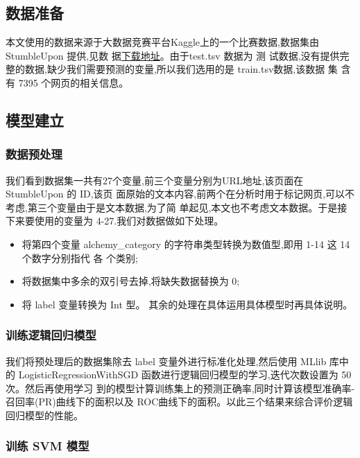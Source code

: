 \subsection{数据准备}\label{ux6570ux636eux51c6ux5907}

本文使用的数据来源于大数据竞赛平台Kaggle上的一个比赛数据,数据集由StumbleUpon 提供,见数
据\href{https://www.kaggle.com/c/stumbleupon/data?train.tsv}{下载地址}。由于test.tsv 数据为
测 试数据,没有提供完整的数据,缺少我们需要预测的变量,所以我们选用的是 train.tsv数据,该数据
集 含有 7395 个网页的相关信息。

\subsection{模型建立}\label{ux6a21ux578bux5efaux7acb}

\subsubsection{数据预处理}\label{ux6570ux636eux9884ux5904ux7406}

我们看到数据集一共有27个变量,前三个变量分别为URL地址,该页面在
StumbleUpon 的 ID,该页
面原始的文本内容,前两个在分析时用于标记网页,可以不考虑,第三个变量由于是文本数据,为了简
单起见,本文也不考虑文本数据。于是接下来要使用的变量为
4-27.我们对数据做如下处理。

\begin{itemize}
\item
  将第四个变量 alchemy\_category 的字符串类型转换为数值型,即用 1-14 这
  14 个数字分别指代 各 个类别;
\item
  将数据集中多余的双引号去掉,将缺失数据替换为 0;
\item
  将 label 变量转换为 Int 型。
  其余的处理在具体运用具体模型时再具体说明。
\end{itemize}

\subsubsection{训练逻辑回归模型}\label{ux8badux7ec3ux903bux8f91ux56deux5f52ux6a21ux578b}

我们将预处理后的数据集除去 label 变量外进行标准化处理,然后使用 MLlib
库中的 LogisticRegressionWithSGD
函数进行逻辑回归模型的学习,迭代次数设置为 50 次。然后再使用学习
到的模型计算训练集上的预测正确率,同时计算该模型准确率-召回率(PR)曲线下的面积以及
ROC曲线下的面积。以此三个结果来综合评价逻辑回归模型的性能。

\subsubsection{训练 SVM 模型}\label{ux8badux7ec3-svm-ux6a21ux578b}


